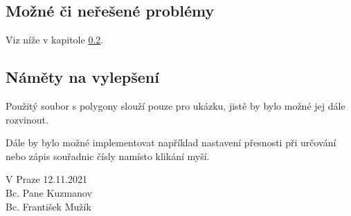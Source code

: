 \documentclass[a4paper, 12pt, oneside, titlepage]{article} %
\begin{document}
\subsection{Možné či neřešené problémy}
Viz níže v kapitole \ref{vylepseni}.


\subsection{Náměty na vylepšení} \label{vylepseni}
Použitý soubor s polygony slouží pouze pro ukázku, jistě by bylo možné jej dále rozvinout. 

Dále by bylo možné implementovat například nastavení přesnosti při určování nebo zápis souřadnic čísly namísto klikání myší.


\begin{flushright}
V Praze 12.11.2021\\
\vspace{2mm}
Bc. Pane Kuzmanov\\
Bc. František Mužík\\
\end{flushright}
\end{document}
